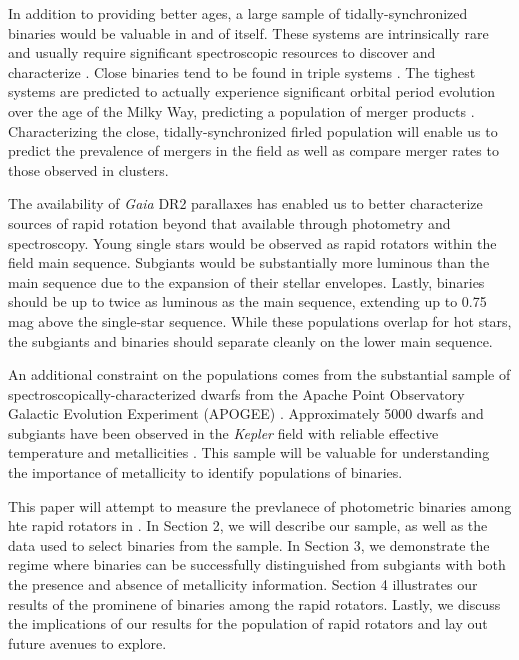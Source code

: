 \documentclass[manuscript]{aastex6}
\newcommand{\Kepler}{\mbox{\textit{Kepler}}}
\newcommand{\Gaia}{\mbox{\textit{Gaia}}}
\begin{document}
In addition to providing better ages, a large sample of tidally-synchronized
binaries would be valuable in and of itself. These systems are intrinsically
rare and usually require significant spectroscopic resources to discover and
characterize \citep{Mathieu90, Raghavan10, Geller15}. Close binaries tend to be
found in triple systems \citep{Tokovinin06}. The tighest systems are predicted
to actually experience significant orbital period evolution over the age of the
Milky Way, predicting a population of merger products \citep{Andronov06}.
Characterizing the close, tidally-synchronized firled population will enable us
to predict the prevalence of mergers in the field as well as compare merger
rates to those observed in clusters.

The availability of \Gaia{} DR2 parallaxes \citep{Gaia18,Lindegren18} has
enabled us to better characterize sources of rapid rotation beyond that
available through photometry and spectroscopy. Young single stars would be
observed as rapid rotators within the field main sequence. Subgiants would be
substantially more luminous than the main sequence due to the expansion of
their stellar envelopes. Lastly, binaries should be up to twice as luminous as
the main sequence, extending up to 0.75 mag above the single-star sequence.
While these populations overlap for hot stars, the subgiants and binaries
should separate cleanly on the lower main sequence.

An additional constraint on the populations comes from the substantial sample
of spectroscopically-characterized dwarfs from the Apache Point Observatory
Galactic Evolution Experiment (APOGEE) \citep{Majewski17}. Approximately 5000 dwarfs and subgiants
have been observed in the \Kepler{} field with reliable effective temperature
and metallicities \citep{Holtzmann18}. This sample will be valuable for
understanding the importance of metallicity to identify populations of
binaries.

This paper will attempt to measure the prevlanece of photometric binaries among
hte rapid rotators in \citep{McQuillan14}. In Section 2, we will describe our
sample, as well as the data used to select binaries from the sample. In Section
3, we demonstrate the regime where binaries can be successfully distinguished
from subgiants with both the presence and absence of metallicity information.
Section 4 illustrates our results of the prominene of binaries among the rapid
rotators. Lastly, we discuss the implications of our results for the population
of rapid rotators and lay out future avenues to explore.
\end{document}
